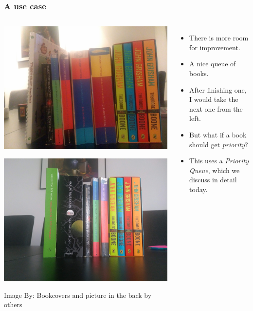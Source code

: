 \begin{frame}
	\frametitle{A use case}
	\begin{columns}
	\begin{center}

					\includegraphics[width=0.5\linewidth]{images/books_read.jpg}
	
					\includegraphics[width=0.5\linewidth]{images/books_unread.jpg}

{\scriptsize Image By:}
{\scriptsize Bookcovers and picture in the back by others}
	\end{center}
		\begin{itemize}
			\item There is more room for improvement.
				
			\item A nice \alert{queue} of books.
				
			\item After finishing one, I would take the next one from the left.
				
			\item But what if a book should get \textit{priority}?
				
			\item This uses a \textit{Priority Queue}, which we discuss in detail today.
		\end{itemize}
	\end{columns}
\end{frame}



